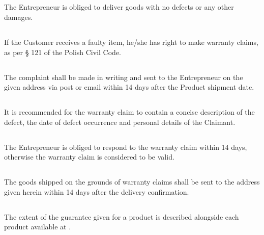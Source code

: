 
			\subsection{} The Entrepreneur is obliged to deliver goods with no defects or any other damages.

			\subsection{} If the Customer receives a faulty item, he/she has right to make warranty claims, as per § 121 of the Polish Civil Code.

			\subsection{} The complaint shall be made in writing and sent to the Entrepreneur on the given address via post or email within 14 days after the Product shipment date.

			\subsection{} It is recommended for the warranty claim to contain a concise description of the defect, the date of defect occurrence and personal details of the Claimant.
			
			\subsection{} The Entrepreneur is obliged to respond to the warranty claim within 14 days, otherwise the warranty claim is considered to be valid.

			\subsection{} The goods shipped on the grounds of warranty claims shall be sent to the address given herein within 14 days after the delivery confirmation.

			\subsection{} The extent of the guarantee given for a product is described alongside each product available at \httpaddr.
 
 
